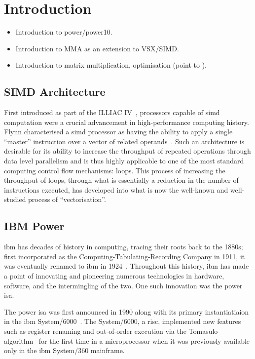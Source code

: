 \documentclass[\main/thesis.tex]{subfiles}
\begin{document}
\chapter{Introduction}
\label{cha:intro}

\begin{itemize}
  \item Introduction to \gls{power}/\gls{power10}.
  \item Introduction to MMA as an extension to VSX/SIMD.
  \item Introduction to matrix multiplication, optimisation (point to ).
\end{itemize}

\section{SIMD Architecture}
First introduced as part of the ILLIAC IV~\autocite{barnes1968illiac}, processors capable of \gls{simd} computation were a crucial advancement in high-performance computing history.
Flynn characterised a \gls{simd} processor as having the ability to apply a single ``master'' instruction over a vector of related operands~\autocite{flynn1972some}.
Such an architecture is desirable for its ability to increase the throughput of repeated operations through data level parallelism and is thus highly applicable to one of the most standard computing control flow mechanisms: loops.
This process of increasing the throughput of loops, through what is essentially a reduction in the number of instructions executed, has developed into what is now the well-known and well-studied process of ``\gls{vectorisation}''.

\section{IBM Power}
\Gls{ibm} has decades of history in computing, tracing their roots back to the 1880s; first incorporated as the Computing-Tabulating-Recording Company in 1911, it was eventually renamed to \gls{ibm} in 1924~\autocite{ibmarchive}.
Throughout this history, \gls{ibm} has made a point of innovating and pioneering numerous technologies in hardware, software, and the intermingling of the two.
One such innovation was the \gls{power} \gls{isa}.

The \gls{power} \gls{isa} was first announced in 1990 along with its primary instantiatiaion in the \gls{ibm} System/6000~\autocite{montoye1990design}.
The System/6000, a \gls{risc}, implemented new features such as register renaming and out-of-order execution via the Tomasulo algorithm~\autocite{tomasulo1967efficient}  for the first time in a microprocessor when it was previously available only in the \gls{ibm} System/360 mainframe.
\end{document}
